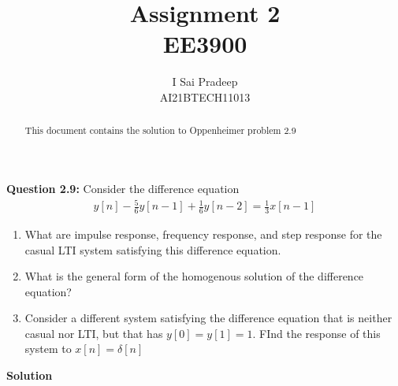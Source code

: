 \documentclass[journal,12pt,two column]{IEEEtran}
\begin{document}
	\providecommand{\fourier}{\overset{\mathcal{F}}{ \rightleftharpoons}}
	\providecommand{\ztrans}{\overset{\mathcal{Z}}{ \rightleftharpoons}}
	
	\providecommand{\system}{\overset{\mathcal{H}}{ \longleftrightarrow}}
	

	\title{\huge{Assignment 2}\\EE3900}
	\author{\Large{I Sai Pradeep}\\AI21BTECH11013}
	\maketitle
    
	\begin{abstract}
	This document contains the solution to Oppenheimer problem 2.9
	\end{abstract}
	\noindent \textbf{Question 2.9:}
Consider the difference equation 
\begin{align}
	\label{eq:question}
  y[n]-\frac{5}{6} y[n-1]+\frac{1}{6} y[n-2]=\frac{1}{3} x[n-1]
\end{align}
\begin{enumerate}
  \item What are impulse response, frequency response, and step response for the casual LTI system satisfying this difference equation.
  \item What is the general form of the homogenous solution of the difference equation?
  \item Consider a different system satisfying the difference equation that is neither casual nor LTI, but that has $y[0]=y[1]=1$. FInd the response of this system to $x[n]= \delta[n]$
\end{enumerate}
\textbf{Solution} 
\end{document}
